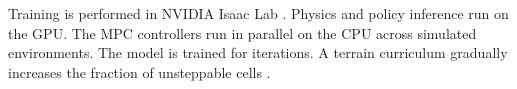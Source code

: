 Training is performed in NVIDIA Isaac Lab \cite{mittal_orbit_2023}.
Physics and policy inference run on the GPU. The MPC controllers run
in parallel on the CPU across \corlParallelEnvs{} simulated
environments. The model is trained for \corlTrainingIterations{}
iterations. A terrain curriculum gradually increases the fraction of
unsteppable cells \cite{Sullivan2025}.
